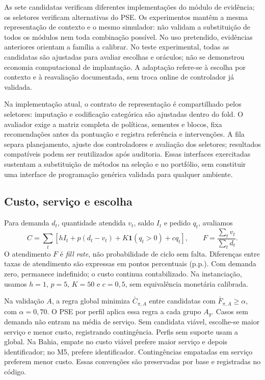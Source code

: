 \documentclass[preprint,12pt]{elsarticle}
\begin{document}
As sete candidatas verificam diferentes implementações do módulo de evidência; os seletores verificam alternativas do PSE. Os experimentos mantêm a mesma representação de contexto e o mesmo simulador: não validam a substituição de todos os módulos nem toda combinação possível. No uso pretendido, evidências anteriores orientam a família a calibrar. No teste experimental, todas as candidatas são ajustadas para avaliar escolhas e oráculos; não se demonstrou economia computacional de implantação. A adaptação refere-se à escolha por contexto e à reavaliação documentada, sem troca online de controlador já validada.

Na implementação atual, o contrato de representação é compartilhado pelos seletores: imputação e codificação categórica são ajustadas dentro do fold. O avaliador exige a matriz completa de políticas, sementes e blocos, fixa recomendações antes da pontuação e registra referência e intervenções. A fila separa planejamento, ajuste dos controladores e avaliação dos seletores; resultados compatíveis podem ser reutilizados após auditoria. Essas interfaces exercitadas sustentam a substituição de métodos na seleção e no portfólio, sem constituir uma interface de programação genérica validada para qualquer ambiente.

\subsection{Custo, serviço e escolha}
Para demanda $d_t$, quantidade atendida $v_t$, saldo $I_t$ e pedido $q_t$, avaliamos
\begin{equation}
 C=\sum_t[hI_t+p(d_t-v_t)+K\mathbf1(q_t>0)+cq_t],
 \qquad F=\frac{\sum_t v_t}{\sum_t d_t}.
 \label{eq:metrics}
\end{equation}
O atendimento $F$ é \textit{fill rate}, não probabilidade de ciclo sem falta. Diferenças entre taxas de atendimento são expressas em pontos percentuais (p.p.). Com demanda zero, permanece indefinido; o custo continua contabilizado. Na instanciação, usamos $h=1$, $p=5$, $K=50$ e $c=0{,}5$, sem equivalência monetária calibrada.

Na validação $A$, a regra global minimiza $\bar C_{\pi,A}$ entre candidatas com $\bar F_{\pi,A}\geq\alpha$, com $\alpha=0{,}70$. O PSE por perfil aplica essa regra a cada grupo $A_g$. Casos sem demanda não entram na média de serviço. Sem candidata viável, escolhe-se maior serviço e menor custo, registrando contingência. Perfis sem suporte usam a global. Na Bahia, empate no custo viável prefere maior serviço e depois identificador; no M5, prefere identificador. Contingências empatadas em serviço preferem menor custo. Essas convenções são preservadas por base e registradas no código.
\end{document}
